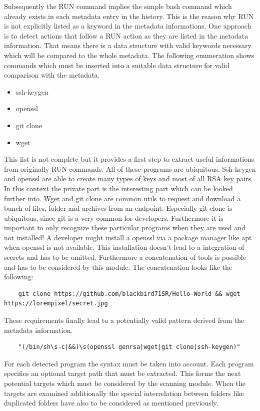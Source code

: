 Subsequently the RUN command implies the simple bash command which already exists in each metadata entry in the history. This is the reason why RUN is not explicitly listed as a keyword in the metadata informations. 
One approach is to detect actions that follow a RUN action as they are listed in the metadata information. That means there is a data structure with valid keywords necessary which will be compared to the whole metadata.
The following enumeration shows commands which must be inserted into a suitable data structure for valid comparison with the metadata.
\begin{itemize}
\item ssh-keygen
\item openssl
\item git clone
\item wget
\end{itemize}
This list is not complete but it provides a first step to extract useful informations from originally RUN commands. All of these programs are ubiquitous.
Ssh-keygen and openssl are able to create many types of keys and most of all RSA key pairs. In this context the private part is the interesting part which can be looked further into.
Wget and git clone are common utils to request and download a bunch of files, folder and archives from an endpoint. Especially git clone is ubiquitous, since git is a very common for developers.
Furthermore it is important to only recognize these particular programs when they are used and not installed! A developer might install a openssl via a package manager like apt when openssl is not available.
This installation doesn't lead to a integration of secrets and has to be omitted.
Furthermore a concatenation of tools is possible and has to be considered by this module. The concatenation looks like the following:
\begin{lstlisting}
	git clone https://github.com/blackbird71SR/Hello-World && wget https://lorempixel/secret.jpg
\end{lstlisting}

These requirements finally lead to a potentially valid pattern derived from the metadata information.
\begin{lstlisting}
	"(/bin/sh\s-c|&&)\s(openssl genrsa|wget|git clone|ssh-keygen)"
\end{lstlisting}

For each detected program the syntax must be taken into account. Each program specifies an optional target path that must be extracted. This forms the next potential targets which must be considered by the scanning module. When the targets are examined additionally the special interrelation between folders like duplicated folders have also to be considered as mentioned previously.

